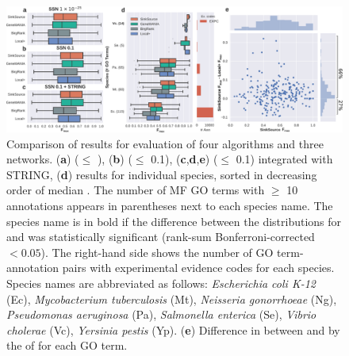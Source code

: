 \begin{figure}[H]
    \centering
    \includegraphics[width=\textwidth]{supp-figs/fig2-expc-compare-eval-fmax-sinksource-localplus-mf-a0_95.pdf}
    \caption{
      Comparison of \fmax results for \loso evaluation of four algorithms and three networks.
      (\textbf{a}) \SSN (\eval $\le$ ),
      (\textbf{b}) \SSN (\eval $\le$ 0.1),
      (\textbf{c},\textbf{d},\textbf{e}) \SSN (\eval $\le$ 0.1) integrated with STRING,
      (\textbf{d}) \loso results for individual species, sorted in decreasing order of median \fmax. The number of MF GO terms with $\ge$ 10 annotations appears in parentheses next to each species name.  The species name is in bold if the difference between the distributions for \sinksource and \localplus was statistically significant (rank-sum Bonferroni-corrected \pval $< 0.05$). \protect The right-hand side shows the number of GO term-annotation pairs with experimental evidence codes for each species.
    Species names are abbreviated as follows:
    \textit{Escherichia coli K-12} (Ec),
    \textit{Mycobacterium tuberculosis} (Mt),
    \textit{Neisseria gonorrhoeae} (Ng),
    \textit{Pseudomonas aeruginosa} (Pa),
    \textit{Salmonella enterica} (Se),
    \textit{Vibrio cholerae} (Vc),
    \textit{Yersinia pestis} (Yp).
    (\textbf{e}) Difference in \fmax between \sinksource and \localplus by the \fmax of \sinksource for each GO term. 
    }
    \label{fig:loso-results-exp-mf}
\end{figure}


